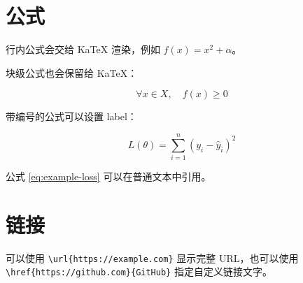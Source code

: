 \section{公式}

行内公式会交给 KaTeX 渲染，例如 $f(x)=x^2+\alpha$。

块级公式也会保留给 KaTeX：

\[
\forall x \in X,\quad f(x) \ge 0
\]

带编号的公式可以设置 label：

\begin{equation}
\label{eq:example-loss}
L(\theta)=\sum_{i=1}^{n}(y_i-\hat{y}_i)^2
\end{equation}

公式 \ref{eq:example-loss} 可以在普通文本中引用。

\section{链接}

可以使用 \verb|\url{https://example.com}| 显示完整 URL，也可以使用 \verb|\href{https://github.com}{GitHub}| 指定自定义链接文字。


